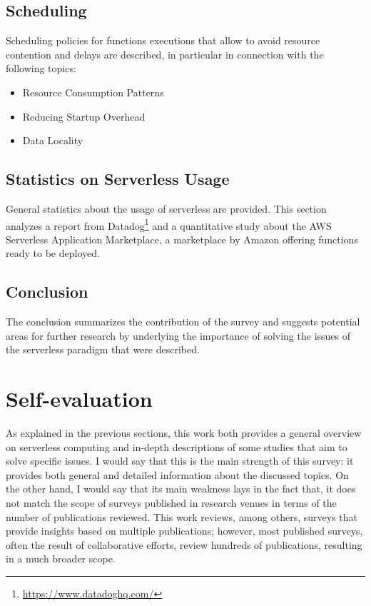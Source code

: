 \documentclass{scrartcl}
\begin{document}
\subsection{Scheduling}
Scheduling policies for functions executions that allow to avoid resource contention and delays are described, in particular in connection with the following topics:
\begin{itemize}
  \item Resource Consumption Patterns
  \item Reducing Startup Overhead
  \item Data Locality
\end{itemize}

\subsection{Statistics on Serverless Usage}
General statistics about the usage of serverless are provided. This section analyzes a report from Datadog\footnote{\url{https://www.datadoghq.com/}} and a quantitative study about the AWS Serverless Application Marketplace, a marketplace by Amazon offering functions ready to be deployed.

\subsection{Conclusion}
The conclusion summarizes the contribution of the survey and suggests potential areas for further research by underlying the importance of solving the issues of the serverless paradigm that were described.

\newpage
\section{Self-evaluation}
As explained in the previous sections, this work both provides a general overview on serverless computing and in-depth descriptions of some studies that aim to solve specific issues. I would say that this is the main strength of this survey: it provides both general and detailed information about the discussed topics. On the other hand, I would say that its main weakness lays in the fact that, it does not match the scope of surveys published in research venues in terms of the number of publications reviewed. This work reviews, among others, surveys that provide insights based on multiple publications; however, most published surveys, often the result of collaborative efforts, review hundreds of publications, resulting in a much broader scope.
\end{document}
